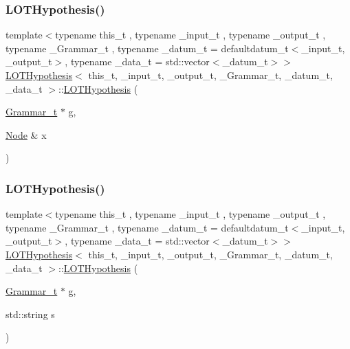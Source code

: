 \subsubsection{\texorpdfstring{L\+O\+T\+Hypothesis()}{LOTHypothesis()}\hspace{0.1cm}{\footnotesize\ttfamily [3/4]}}
{\footnotesize\ttfamily template$<$typename this\+\_\+t , typename \+\_\+input\+\_\+t , typename \+\_\+output\+\_\+t , typename \+\_\+\+Grammar\+\_\+t , typename \+\_\+datum\+\_\+t  = defaultdatum\+\_\+t$<$\+\_\+input\+\_\+t, \+\_\+output\+\_\+t$>$, typename \+\_\+data\+\_\+t  = std\+::vector$<$\+\_\+datum\+\_\+t$>$$>$ \\
\hyperlink{class_l_o_t_hypothesis}{L\+O\+T\+Hypothesis}$<$ this\+\_\+t, \+\_\+input\+\_\+t, \+\_\+output\+\_\+t, \+\_\+\+Grammar\+\_\+t, \+\_\+datum\+\_\+t, \+\_\+data\+\_\+t $>$\+::\hyperlink{class_l_o_t_hypothesis}{L\+O\+T\+Hypothesis} (\begin{DoxyParamCaption}\item[{\hyperlink{class_l_o_t_hypothesis_a5393058e614835e0f139bd40acb183b2}{Grammar\+\_\+t} $\ast$}]{g,  }\item[{\hyperlink{class_node}{Node} \&}]{x }\end{DoxyParamCaption})\hspace{0.3cm}{\ttfamily [inline]}}

\mbox{\label{class_l_o_t_hypothesis_a070478ca663d496087c58a8caec65bf3}} 
\subsubsection{\texorpdfstring{L\+O\+T\+Hypothesis()}{LOTHypothesis()}\hspace{0.1cm}{\footnotesize\ttfamily [4/4]}}
{\footnotesize\ttfamily template$<$typename this\+\_\+t , typename \+\_\+input\+\_\+t , typename \+\_\+output\+\_\+t , typename \+\_\+\+Grammar\+\_\+t , typename \+\_\+datum\+\_\+t  = defaultdatum\+\_\+t$<$\+\_\+input\+\_\+t, \+\_\+output\+\_\+t$>$, typename \+\_\+data\+\_\+t  = std\+::vector$<$\+\_\+datum\+\_\+t$>$$>$ \\
\hyperlink{class_l_o_t_hypothesis}{L\+O\+T\+Hypothesis}$<$ this\+\_\+t, \+\_\+input\+\_\+t, \+\_\+output\+\_\+t, \+\_\+\+Grammar\+\_\+t, \+\_\+datum\+\_\+t, \+\_\+data\+\_\+t $>$\+::\hyperlink{class_l_o_t_hypothesis}{L\+O\+T\+Hypothesis} (\begin{DoxyParamCaption}\item[{\hyperlink{class_l_o_t_hypothesis_a5393058e614835e0f139bd40acb183b2}{Grammar\+\_\+t} $\ast$}]{g,  }\item[{std\+::string}]{s }\end{DoxyParamCaption})\hspace{0.3cm}{\ttfamily [inline]}}



